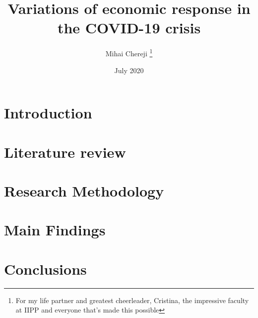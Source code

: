 \documentclass{article}
\title {Variations of economic response in the COVID-19 crisis}
\date {July 2020}
\author {Mihai Chereji
    \thanks{For my life partner and greatest cheerleader, Cristina, the impressive faculty at IIPP and everyone that's made this possible}
}
\begin{document}
\maketitle
\section{Introduction}


\section{Literature review}
\autocite{kruppe_labour_2014} \autocite{blanchard_hysteresis_1986}
\section{Research Methodology}
\section{Main Findings}
\section{Conclusions}
\begin{figure}
\end{figure}
\printbibliography{}
\end{document}
